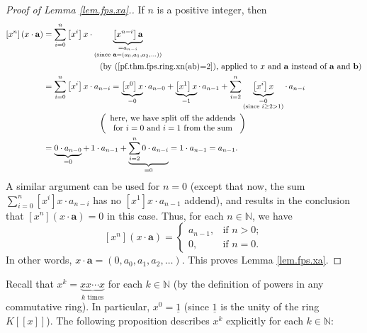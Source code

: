 \begin{proof}
[Proof of Lemma \ref{lem.fps.xa}.]If $n$ is a positive integer, then%
\begin{align*}
\left[  x^{n}\right]  \left(  x\cdot\mathbf{a}\right)   &  =\sum_{i=0}%
^{n}\left[  x^{i}\right]  x\cdot\underbrace{\left[  x^{n-i}\right]
\mathbf{a}}_{\substack{=a_{n-i}\\\text{(since }\mathbf{a}=\left(  a_{0}%
,a_{1},a_{2},\ldots\right)  \text{)}}}\\
&  \ \ \ \ \ \ \ \ \ \ \ \ \ \ \ \ \ \ \ \ \left(  \text{by
(\ref{pf.thm.fps.ring.xn(ab)=2}), applied to }x\text{ and }\mathbf{a}\text{
instead of }\mathbf{a}\text{ and }\mathbf{b}\right) \\
&  =\sum_{i=0}^{n}\left[  x^{i}\right]  x\cdot a_{n-i}=\underbrace{\left[
x^{0}\right]  x}_{=0}\cdot\,a_{n-0}+\underbrace{\left[  x^{1}\right]  x}%
_{=1}\cdot\,a_{n-1}+\sum_{i=2}^{n}\underbrace{\left[  x^{i}\right]
x}_{\substack{=0\\\text{(since }i\geq2>1\text{)}}}\cdot\,a_{n-i}\\
&  \ \ \ \ \ \ \ \ \ \ \ \ \ \ \ \ \ \ \ \ \left(
\begin{array}
[c]{c}%
\text{here, we have split off the addends}\\
\text{for }i=0\text{ and }i=1\text{ from the sum}%
\end{array}
\right) \\
&  =\underbrace{0\cdot a_{n-0}}_{=0}+\,1\cdot a_{n-1}+\underbrace{\sum
_{i=2}^{n}0\cdot a_{n-i}}_{=0}=1\cdot a_{n-1}=a_{n-1}.
\end{align*}
A similar argument can be used for $n=0$ (except that now, the sum $\sum
_{i=0}^{n}\left[  x^{i}\right]  x\cdot a_{n-i}$ has no $\left[  x^{1}\right]
x\cdot a_{n-1}$ addend), and results in the conclusion that $\left[
x^{n}\right]  \left(  x\cdot\mathbf{a}\right)  =0$ in this case. Thus, for
each $n\in\mathbb{N}$, we have%
\[
\left[  x^{n}\right]  \left(  x\cdot\mathbf{a}\right)  =%
\begin{cases}
a_{n-1}, & \text{if }n>0;\\
0, & \text{if }n=0.
\end{cases}
\]
In other words, $x\cdot\mathbf{a}=\left(  0,a_{0},a_{1},a_{2},\ldots\right)
$. This proves Lemma \ref{lem.fps.xa}.
\end{proof}

Recall that $x^{k}=\underbrace{xx\cdots x}_{k\text{ times}}$ for each
$k\in\mathbb{N}$ (by the definition of powers in any commutative ring). In
particular, $x^{0}=\underline{1}$ (since $\underline{1}$ is the unity of the
ring $K\left[  \left[  x\right]  \right]  $). The following proposition
describes $x^{k}$ explicitly for each $k\in\mathbb{N}$:

